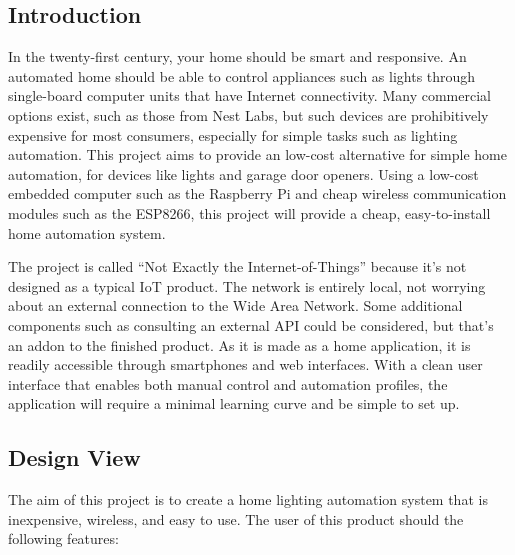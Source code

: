 \subsection{Introduction}

In the twenty-first century, your home should be smart and responsive. An
automated home should be able to control appliances such as lights through
single-board computer units that have Internet connectivity. Many commercial
options exist, such as those from Nest Labs, but such devices are prohibitively
expensive for most consumers, especially for simple tasks such as lighting
automation. This project aims to provide an low-cost alternative for simple
home automation, for devices like lights and garage door openers. Using a
low-cost embedded computer such as the Raspberry Pi and cheap wireless
communication modules such as the ESP8266, this project will provide a cheap,
easy-to-install home automation system.

The project is called ``Not Exactly the Internet-of-Things'' because it's not
designed as a typical IoT product. The network is entirely local, not worrying
about an external connection to the Wide Area Network. Some additional
components such as consulting an external API could be considered, but that's
an addon to the finished product. As it is made as a home application, it is
readily accessible through smartphones and web interfaces. With a clean user
interface that enables both manual control and automation profiles, the
application will require a minimal learning curve and be simple to set up.  

\subsection{Design View}

The aim of this project is to create a home lighting automation system that is
inexpensive, wireless, and easy to use. The user of this product should the
following features:

